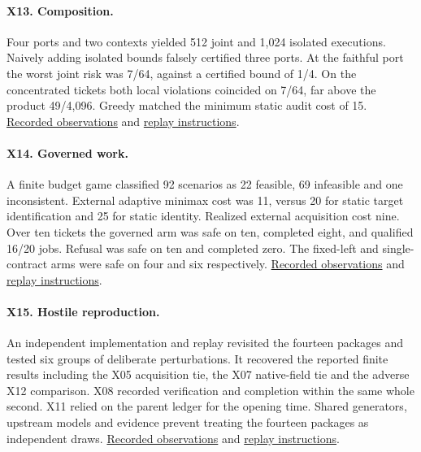 \paragraph{X13. Composition.} Four ports and two contexts yielded 512 joint and 1,024 isolated executions. Naively adding isolated bounds falsely certified three ports. At the faithful port the worst joint risk was 7/64, against a certified bound of 1/4. On the concentrated tickets both local violations coincided on 7/64, far above the product 49/4,096. Greedy matched the minimum static audit cost of 15. \href{https://github.com/Perceptive-Closure/PC-X/blob/1b9e599a7333d9b9f85669298791557282a75c1b/EXPERIMENTS/EXP-X13/results/summary.json}{Recorded observations} and \href{https://github.com/Perceptive-Closure/PC-X/blob/1b9e599a7333d9b9f85669298791557282a75c1b/EXPERIMENTS/EXP-X13/README.md}{replay instructions}.

\paragraph{X14. Governed work.} A finite budget game classified 92 scenarios as 22 feasible, 69 infeasible and one inconsistent. External adaptive minimax cost was 11, versus 20 for static target identification and 25 for static identity. Realized external acquisition cost nine. Over ten tickets the governed arm was safe on ten, completed eight, and qualified 16/20 jobs. Refusal was safe on ten and completed zero. The fixed-left and single-contract arms were safe on four and six respectively. \href{https://github.com/Perceptive-Closure/PC-X/blob/4ed49718f364afe9ba0723e96f4111c370a12101/EXPERIMENTS/EXP-X14/results/summary.json}{Recorded observations} and \href{https://github.com/Perceptive-Closure/PC-X/blob/4ed49718f364afe9ba0723e96f4111c370a12101/EXPERIMENTS/EXP-X14/README.md}{replay instructions}.

\paragraph{X15. Hostile reproduction.} An independent implementation and replay revisited the fourteen packages and tested six groups of deliberate perturbations. It recovered the reported finite results including the X05 acquisition tie, the X07 native-field tie and the adverse X12 comparison. X08 recorded verification and completion within the same whole second. X11 relied on the parent ledger for the opening time. Shared generators, upstream models and evidence prevent treating the fourteen packages as independent draws. \href{https://github.com/Perceptive-Closure/PC-X/blob/9c3884846c895ead014ba06895cf74da2d15e726/EXPERIMENTS/EXP-X15/results/independent.json}{Recorded observations} and \href{https://github.com/Perceptive-Closure/PC-X/blob/9c3884846c895ead014ba06895cf74da2d15e726/EXPERIMENTS/EXP-X15/README.md}{replay instructions}.

